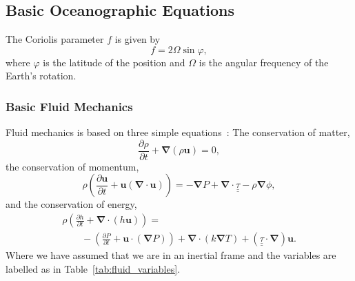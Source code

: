 \subsection{Basic Oceanographic Equations}

The Coriolis parameter $f$ is given by
\begin{equation}
f=2 \Omega \sin \varphi,
\label{eq:coriolis}
\end{equation}
where $\varphi$ is the latitude of the position and $\Omega$ is the angular
 frequency of the Earth's rotation.

\subsubsection{Basic Fluid Mechanics}
Fluid mechanics is based on three simple equations~\cite{landau1959course}:
 The conservation of matter,
\begin{equation}
\frac{\partial \rho}{\partial t} + \boldsymbol{\nabla}(\rho \boldsymbol{u}) = 0,
\tag{Matter}
\label{eq:Matter}
\end{equation}
the conservation of momentum,
\begin{equation}
\rho\left (\frac{\partial \mathbf{u}}{\partial t}
+ \mathbf{u}(\boldsymbol{\nabla}\cdot \mathbf{u})\right) =
- \boldsymbol{\nabla}P + \boldsymbol{\nabla}\cdot \underline{\underline{\tau}}
- \rho\boldsymbol{\nabla}\phi,
\tag{Momentum}
\end{equation}
and the conservation of energy,
\begin{equation}
\begin{array}{l}
\rho \left( \frac{\partial h}{\partial t} + \boldsymbol{\nabla}
\cdot (h\mathbf{u})\right) = \\ \quad\quad- \left( \frac{\partial P}{\partial t}
+ \mathbf{u}\cdot (\boldsymbol{\nabla} P) \right)
+ \boldsymbol{\nabla}\cdot (k \boldsymbol{\nabla} T )
+ (\underline{\underline{\tau}}\cdot\boldsymbol{\nabla})\mathbf{u}.\end{array}
\tag{Energy}
\end{equation}
Where we have assumed that we are in an inertial frame and the variables are
labelled as in Table~\ref{tab:fluid_variables}.

